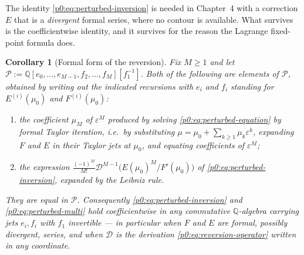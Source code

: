 \documentclass[11pt,a4paper,oneside]{book}
\theoremstyle{plain}
\newtheorem{corollary}[theorem]{Corollary}
\theoremstyle{definition}
\theoremstyle{remark}
\newcommand{\Rat}{\mathbb{Q}}
\begin{document}
The identity \eqref{p0:eq:perturbed-inversion} is needed in Chapter~4 with a
correction $E$ that is a \emph{divergent} formal series, where no contour is
available.  What survives is the coefficientwise identity, and it survives for
the reason the Lagrange fixed-point formula does.

\begin{corollary}[Formal form of the reversion]\label{p0:cor:perturbed-formal}
Fix $M\ge1$ and let
$\mathcal{P}:=\Rat[e_{0},\dots,e_{M-1},f_{2},\dots,f_{M}][f_{1}^{-1}]$.  Both
of the following are elements of $\mathcal{P}$, obtained by writing out the
indicated recursions with $e_{i}$ and $f_{i}$ standing for $E^{(i)}(\mu_{0})$
and $F^{(i)}(\mu_{0})$:
\begin{enumerate}
\item the coefficient $\mu_{M}$ of $\varepsilon^{M}$ produced by solving
\eqref{p0:eq:perturbed-equation} by formal Taylor iteration, i.e.\ by
substituting $\mu=\mu_{0}+\sum_{k\ge1}\mu_{k}\varepsilon^{k}$, expanding $F$
and $E$ in their Taylor jets at $\mu_{0}$, and equating coefficients of
$\varepsilon^{M}$;
\item the expression
$\frac{(-1)^{M}}{M!}\mathcal{D}^{M-1}\bigl(E(\mu_{0})^{M}/F'(\mu_{0})\bigr)$
of \eqref{p0:eq:perturbed-inversion}, expanded by the Leibniz rule.
\end{enumerate}
They are equal in $\mathcal{P}$.  Consequently
\eqref{p0:eq:perturbed-inversion} and \eqref{p0:eq:perturbed-multi} hold
coefficientwise in any commutative $\Rat$-algebra carrying jets
$e_{i},f_{i}$ with $f_{1}$ invertible --- in particular when $F$ and $E$ are
formal, possibly divergent, series, and when $\mathcal{D}$ is the derivation
\eqref{p0:eq:reversion-operator} written in any coordinate.
\end{corollary}
\end{document}
